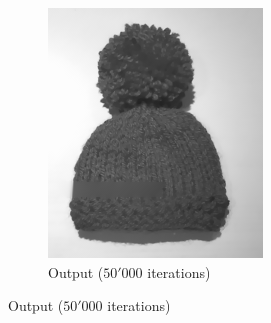 \documentclass{paper}
\begin{document}
\begin{figure}[ht]
\begin{subfigure}[h]{0.45\textwidth}
	\includegraphics[width=\textwidth]{hat-iter50000-lambda100-alpha0_001}
	\caption*{Output ($50'000$ iterations)}
\end{subfigure}


\end{figure}
\end{document}
